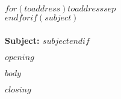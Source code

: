 \documentclass[a4paper, 12pt]{letter}
\begin{document}
\begin{letter}{
    $for(toaddress)$$toaddress$$sep$\\$endfor$$if(subject)$\\ ~ \\\textbf{Subject: $subject$}$endif$
}
\opening{$opening$}

$body$

\longindentation=0pt
\closing{$closing$}

\end{letter}
\end{document}
